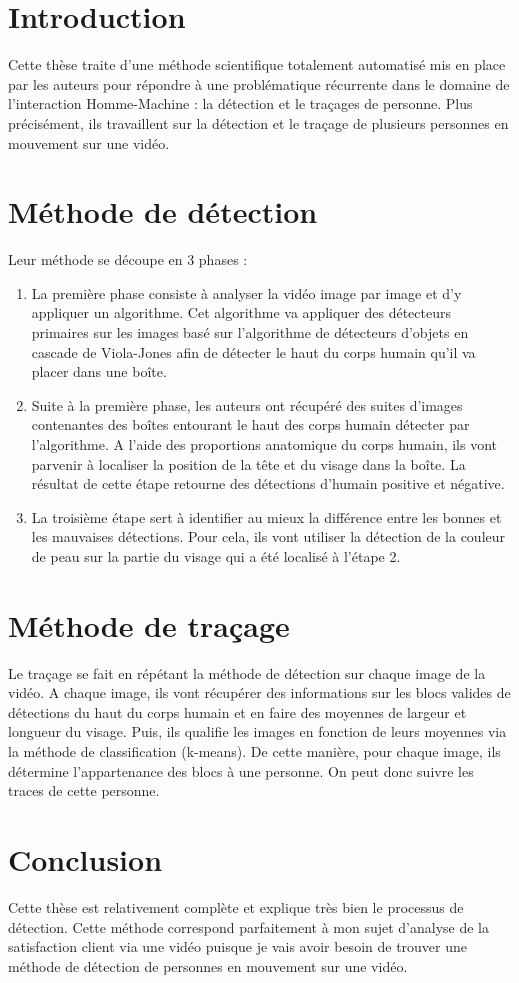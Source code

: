 \documentclass[11pt]{report}
\begin{document}
\section{Introduction}
Cette thèse traite d’une méthode scientifique totalement automatisé mis en place par les auteurs pour répondre à une problématique récurrente dans le domaine de l’interaction Homme-Machine : la détection et le traçages de personne. Plus précisément, ils travaillent sur la détection et le traçage de plusieurs personnes en mouvement sur une vidéo.

\section{Méthode de détection}
Leur méthode se découpe en 3 phases :
	\begin{enumerate}
		\item La première phase consiste à analyser la vidéo image par image et d’y
appliquer un algorithme. Cet algorithme va appliquer des détecteurs
primaires sur les images basé sur l’algorithme de détecteurs d’objets
en cascade de Viola-Jones afin de détecter le haut du corps humain
qu’il va placer dans une boîte.
		\item Suite à la première phase, les auteurs ont récupéré des suites d’images
contenantes des boîtes entourant le haut des corps humain détecter
par l’algorithme. A l’aide des proportions anatomique du corps humain,
ils vont parvenir à localiser la position de la tête et du visage
dans la boîte. La résultat de cette étape retourne des détections d’humain
positive et négative.
		\item La troisième étape sert à identifier au mieux la différence entre les
bonnes et les mauvaises détections. Pour cela, ils vont utiliser la détection
de la couleur de peau sur la partie du visage qui a été localisé
à l’étape 2.
	\end{enumerate}
		
\section{Méthode de traçage}
Le traçage se fait en répétant la méthode de détection sur chaque image
de la vidéo. A chaque image, ils vont récupérer des informations sur les blocs
valides de détections du haut du corps humain et en faire des moyennes de
largeur et longueur du visage. Puis, ils qualifie les images en fonction de leurs
moyennes via la méthode de classification (k-means). De cette manière, pour
chaque image, ils détermine l’appartenance des blocs à une personne. On
peut donc suivre les traces de cette personne.

\section{Conclusion}
Cette thèse est relativement complète et explique très bien le processus
de détection. Cette méthode correspond parfaitement à mon sujet d’analyse
de la satisfaction client via une vidéo puisque je vais avoir besoin de trouver
une méthode de détection de personnes en mouvement sur une vidéo.
\end{document}
